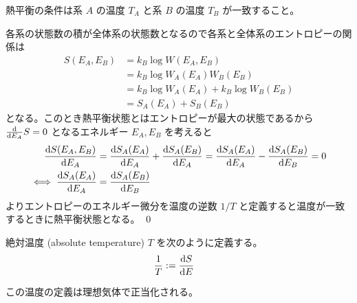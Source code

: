\documentclass[uplatex,diffipdfmx,a4paper,11pt]{jlreq}
\makeatletter
\theoremstyle{definition}
\renewenvironment{proof}[1][\proofname]{\par
  \normalfont
  \topsep6\p@\@plus6\p@ \trivlist
  \item[\hskip\labelsep{\bfseries #1}\@addpunct{\bfseries}]\ignorespaces\quad\par
}{%
  \qed\endtrivlist\@endpefalse
}
\renewcommand\proofname{証明}
\makeatother
\begin{document}
\begin{theorem}
  熱平衡の条件は系 $A$ の温度 $T_A$ と系 $B$ の温度 $T_B$ が一致すること。
\end{theorem}
\begin{proof}
  各系の状態数の積が全体系の状態数となるので各系と全体系のエントロピーの関係は
  \begin{align}
    S(E_A, E_B) & = k_B\log W(E_A, E_B)                 \\
                & = k_B\log W_A(E_A)W_B(E_B)            \\
                & = k_B\log W_A(E_A) + k_B\log W_B(E_B) \\
                & = S_A(E_A) + S_B(E_B)
  \end{align}
  となる。このとき熱平衡状態とはエントロピーが最大の状態であるから $\diff*{S}{E_A} = 0$ となるエネルギー $E_A, E_B$ を考えると
  \begin{align}
    \diff{S(E_A, E_B)}{E_A}   & = \diff{S_A(E_A)}{E_A} + \diff{S_A(E_B)}{E_A} = \diff{S_A(E_A)}{E_A} - \diff{S_A(E_B)}{E_B} = 0 \\
    \iff \diff{S_A(E_A)}{E_A} & = \diff{S_A(E_B)}{E_B}
  \end{align}
  よりエントロピーのエネルギー微分を温度の逆数 $1/T$ と定義すると温度が一致するときに熱平衡状態となる。
\end{proof}

\begin{definition}
  絶対温度 (absolute temperature) $T$ を次のように定義する。
  \begin{align}
    \frac{1}{T} & := \diff{S}{E}
  \end{align}
\end{definition}

この温度の定義は理想気体で正当化される。
\end{document}
